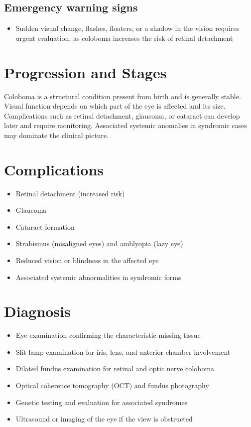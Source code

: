 \subsection{Emergency warning signs}
\begin{itemize}[noitemsep]
  \item Sudden visual change, flashes, floaters, or a shadow in the vision requires urgent evaluation, as coloboma increases the risk of retinal detachment
\end{itemize}
\section{Progression and Stages}
Coloboma is a structural condition present from birth and is generally stable. Visual function depends on which part of the eye is affected and its size. Complications such as retinal detachment, glaucoma, or cataract can develop later and require monitoring. Associated systemic anomalies in syndromic cases may dominate the clinical picture.
\section{Complications}
\begin{itemize}[noitemsep]
  \item Retinal detachment (increased risk)
  \item Glaucoma
  \item Cataract formation
  \item Strabismus (misaligned eyes) and amblyopia (lazy eye)
  \item Reduced vision or blindness in the affected eye
  \item Associated systemic abnormalities in syndromic forms
\end{itemize}
\section{Diagnosis}
\begin{itemize}[noitemsep]
  \item Eye examination confirming the characteristic missing tissue
  \item Slit-lamp examination for iris, lens, and anterior chamber involvement
  \item Dilated fundus examination for retinal and optic nerve coloboma
  \item Optical coherence tomography (OCT) and fundus photography
  \item Genetic testing and evaluation for associated syndromes
  \item Ultrasound or imaging of the eye if the view is obstructed
\end{itemize}
